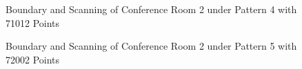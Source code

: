 \documentclass[11pt, a4paper,oneside,chapterprefix=false]{scrbook}
\begin{document}
\begin{figure}[H]
    \centering
      \label{fig:conf2 b 4} \hfill
     \label{fig:conf2 s 4}
    \caption{Boundary and Scanning of Conference Room 2 under Pattern 4 with 71012 Points}
    \label{fig:conf2 4}
\end{figure}

\begin{figure}[H]
    \centering
      \label{fig:conf2 b 5} \hfill
     \label{fig:conf2 s 5}
    \caption{Boundary and Scanning of Conference Room 2 under Pattern 5 with 72002 Points}
    \label{fig:conf2 5}
\end{figure}
\end{document}
